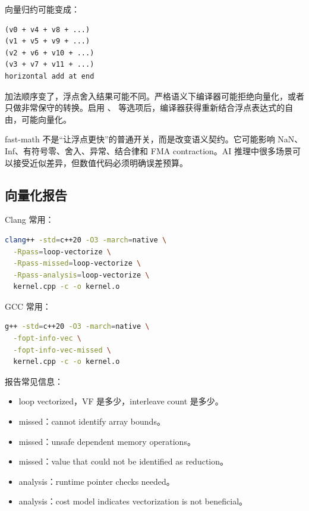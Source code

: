 向量归约可能变成：

\begin{lstlisting}
(v0 + v4 + v8 + ...)
(v1 + v5 + v9 + ...)
(v2 + v6 + v10 + ...)
(v3 + v7 + v11 + ...)
horizontal add at end
\end{lstlisting}

加法顺序变了，浮点舍入结果可能不同。严格语义下编译器可能拒绝向量化，或者只做非常保守的转换。启用 、 等选项后，编译器获得重新结合浮点表达式的自由，可能向量化。

\begin{warningbox}
fast-math 不是“让浮点更快”的普通开关，而是改变语义契约。它可能影响 NaN、Inf、有符号零、舍入、异常、结合律和 FMA contraction。AI 推理中很多场景可以接受近似差异，但数值代码必须明确误差预算。
\end{warningbox}

\subsection{向量化报告}

Clang 常用：

\begin{lstlisting}[language=bash]
clang++ -std=c++20 -O3 -march=native \
  -Rpass=loop-vectorize \
  -Rpass-missed=loop-vectorize \
  -Rpass-analysis=loop-vectorize \
  kernel.cpp -c -o kernel.o
\end{lstlisting}

GCC 常用：

\begin{lstlisting}[language=bash]
g++ -std=c++20 -O3 -march=native \
  -fopt-info-vec \
  -fopt-info-vec-missed \
  kernel.cpp -c -o kernel.o
\end{lstlisting}

报告常见信息：

\begin{itemize}
  \item loop vectorized，VF 是多少，interleave count 是多少。
  \item missed：cannot identify array bounds。
  \item missed：unsafe dependent memory operations。
  \item missed：value that could not be identified as reduction。
  \item analysis：runtime pointer checks needed。
  \item analysis：cost model indicates vectorization is not beneficial。
\end{itemize}

